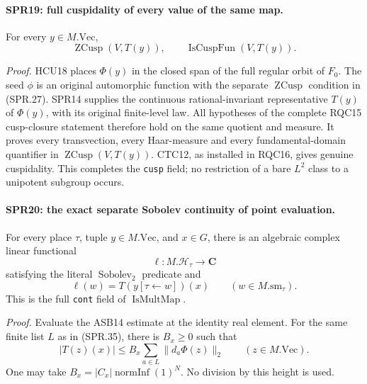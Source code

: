 \documentclass[11pt,a4paper]{article}
\numberwithin{equation}{section}
\theoremstyle{remark}\newtheorem{remark}[theorem]{Remark}
\begin{document}
\paragraph{SPR19: full cuspidality of every value of the same map.}
\label{claim:SPR19}
For every \(y\in M.\mathrm{Vec}\),
\[
             \operatorname{ZCusp}(V,T(y)),
                       \qquad \operatorname{IsCuspFun}(V,T(y)).
 \tag{SPR.37}
\]

\emph{Proof.}
HCU18 places \(\Phi(y)\) in the closed span of the full regular
orbit of \(F_0\).
The seed \(\phi\) is an original automorphic function with the
separate \(\operatorname{ZCusp}\) condition in (SPR.27).
SPR14 supplies the continuous rational-invariant representative
\(T(y)\) of \(\Phi(y)\), with its original finite-level law.
All hypotheses of the complete RQC15 cusp-closure statement
therefore hold on the same quotient and measure.
It proves every transvection, every Haar-measure and every
fundamental-domain quantifier in
\(\operatorname{ZCusp}(V,T(y))\).
CTC12, as installed in RQC16, gives genuine cuspidality.
This completes the \texttt{cusp} field; no restriction of a
bare \(L^2\) class to a unipotent subgroup occurs.

\paragraph{SPR20: the exact separate Sobolev continuity of point evaluation.}
\label{claim:SPR20}
For every place \(\tau\), tuple \(y\in M.\mathrm{Vec}\), and
\(x\in G\), there is an algebraic complex linear functional
\[
                   \ell:M.\mathcal H_\tau\longrightarrow\mathbf C
\]
satisfying the literal \(\operatorname{Sobolev}_2\) predicate and
\[
                    \ell(w)=T(y[\tau\leftarrow w])(x)
                        \qquad(w\in M.\mathrm{sm}_\tau).
 \tag{SPR.38}
\]
This is the full \texttt{cont} field of
\(\operatorname{IsMultMap}\).

\emph{Proof.}
Evaluate the ASB14 estimate at the identity real element.
For the same finite list \(L\) as in (SPR.35), there is \(B_x\ge0\)
such that
\[
             |T(z)(x)|\le B_x
                         \sum_{a\in L}\|d_a\Phi(z)\|_2
                           \qquad(z\in M.\mathrm{Vec}).
 \tag{SPR.39}
\]
One may take \(B_x=|C_x|\operatorname{normInf}(1)^N\).
No division by this height is used.
\end{document}
